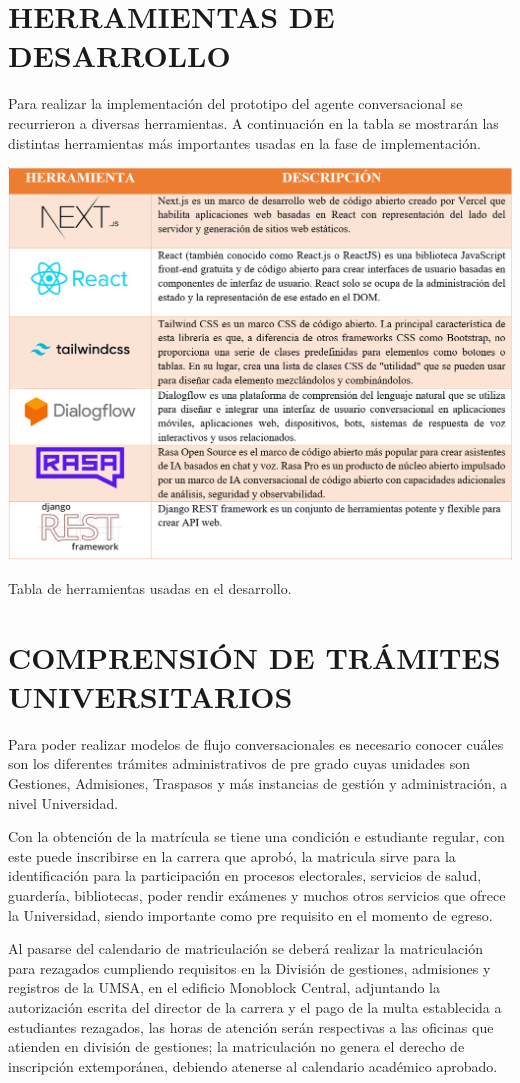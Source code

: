 \documentclass[letter, openright, 12pt]{book}
\begin{document}
\section{HERRAMIENTAS DE DESARROLLO}

Para realizar la implementación del prototipo del agente conversacional se recurrieron a diversas herramientas. A continuación en la tabla se mostrarán las distintas herramientas más importantes usadas en la fase de implementación.

\begin{table}[H]
\includegraphics[width=1\textwidth]{tabla2_2}
\caption{Tabla de herramientas usadas en el desarrollo.}
\label{tab:tabla2_2} 
\end{table}

\section{COMPRENSIÓN DE TRÁMITES UNIVERSITARIOS}

Para poder realizar modelos de flujo conversacionales es necesario conocer cuáles son los diferentes trámites administrativos de pre grado cuyas unidades son Gestiones, Admisiones, Traspasos y más instancias de gestión y administración, a nivel Universidad. 
\par
Con la obtención de la matrícula se tiene una condición e estudiante regular, con este puede inscribirse en la carrera que aprobó, la matricula sirve para la identificación para la participación en procesos electorales, servicios de salud, guardería, bibliotecas, poder rendir exámenes y muchos otros servicios que ofrece la Universidad, siendo importante como pre requisito en el momento de egreso. 
\par
Al pasarse del calendario de matriculación se deberá realizar la matriculación para rezagados cumpliendo requisitos en la División de gestiones, admisiones y registros de la UMSA, en el edificio Monoblock Central, adjuntando la autorización escrita del director de la carrera y el pago de la multa establecida a estudiantes rezagados, las horas de atención serán respectivas a las oficinas que atienden en división de gestiones; la matriculación no genera el derecho de inscripción extemporánea, debiendo atenerse al calendario académico aprobado. 
\end{document}
